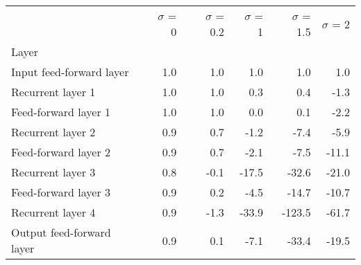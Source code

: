 \begin{tabular}{lrrrrr}
\toprule
{} &  $\sigma$  = 0 &  $\sigma$  = 0.2 &  $\sigma$  = 1 &  $\sigma$  = 1.5 &  $\sigma$  = 2 \\
Layer                     &                &                  &                &                  &                \\
\midrule
Input feed-forward layer  &            1.0 &              1.0 &            1.0 &              1.0 &            1.0 \\
Recurrent layer 1         &            1.0 &              1.0 &            0.3 &              0.4 &           -1.3 \\
Feed-forward layer 1      &            1.0 &              1.0 &            0.0 &              0.1 &           -2.2 \\
Recurrent layer 2         &            0.9 &              0.7 &           -1.2 &             -7.4 &           -5.9 \\
Feed-forward layer 2      &            0.9 &              0.7 &           -2.1 &             -7.5 &          -11.1 \\
Recurrent layer 3         &            0.8 &             -0.1 &          -17.5 &            -32.6 &          -21.0 \\
Feed-forward layer 3      &            0.9 &              0.2 &           -4.5 &            -14.7 &          -10.7 \\
Recurrent layer 4         &            0.9 &             -1.3 &          -33.9 &           -123.5 &          -61.7 \\
Output feed-forward layer &            0.9 &              0.1 &           -7.1 &            -33.4 &          -19.5 \\
\bottomrule
\end{tabular}
